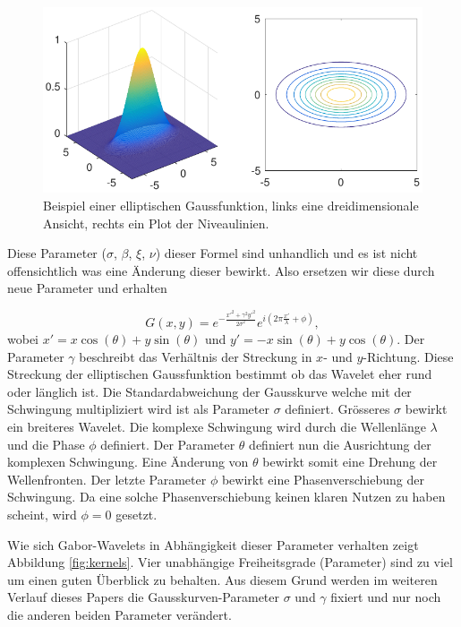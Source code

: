 \begin{figure}
	\centering
	\includegraphics[width=0.7\linewidth]{./papers/visuell/images/2d_gauss.pdf}
	\caption{Beispiel einer elliptischen Gaussfunktion, links eine dreidimensionale Ansicht, rechts ein Plot der Niveaulinien.}
	\label{fig:2d_gauss}
\end{figure}



Diese Parameter ($\sigma$, $\beta$, $\xi$, $\nu$) dieser Formel sind unhandlich und es ist nicht offensichtlich was eine Änderung dieser bewirkt.
Also ersetzen wir diese durch neue Parameter und erhalten 

\begin{equation}
G(x,y)=e^{-\frac{x'^{2}+\gamma^{2}y'^{2}}{2\sigma^{2}}}
e^{i(2\pi\frac{x'}{\lambda} + \phi)},
\end{equation} 
wobei $x'=x\cos(\theta)+y\sin(\theta)$ und $y'=-x\sin(\theta)+y\cos(\theta)$.
Der Parameter $\gamma$ beschreibt das Verhältnis der Streckung in $x$- und $y$-Richtung.
Diese Streckung der elliptischen Gaussfunktion bestimmt ob das Wavelet eher rund oder länglich ist.
Die Standardabweichung der Gausskurve welche mit der Schwingung multipliziert wird ist als Parameter $\sigma$ definiert.
Grösseres $\sigma$ bewirkt ein breiteres Wavelet.
Die komplexe Schwingung wird durch die Wellenlänge $\lambda$ und die Phase $\phi$ definiert.
Der Parameter $\theta$ definiert nun die Ausrichtung der komplexen Schwingung.
Eine Änderung von $\theta$  bewirkt somit eine Drehung der Wellenfronten.
Der letzte Parameter $\phi$ bewirkt eine Phasenverschiebung der Schwingung. 
Da eine solche Phasenverschiebung keinen klaren Nutzen zu haben scheint, wird $\phi=0$ gesetzt.

Wie sich Gabor-Wavelets in Abhängigkeit dieser Parameter verhalten zeigt Abbildung \ref{fig:kernels}.
Vier unabhängige Freiheitsgrade (Parameter) sind zu viel um einen guten Überblick zu behalten.
Aus diesem Grund werden im weiteren Verlauf dieses Papers die Gausskurven-Parameter $\sigma$ und $\gamma$ fixiert und nur noch die anderen beiden Parameter verändert.

